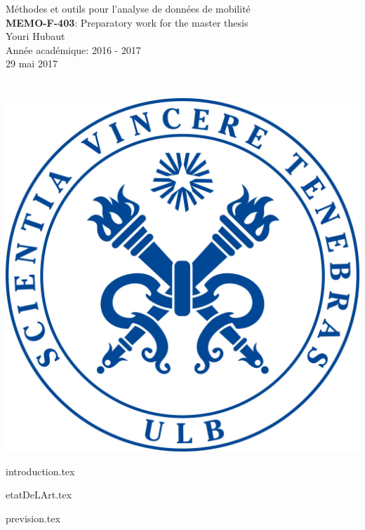 \documentclass[11pt,a4paper]{report}
\begin{document}

\begin{titlepage}
    \vspace*{\fill}
    \begin{center}
        \huge {Méthodes et outils pour l'analyse de données de mobilité} \\
	    \textbf{MEMO-F-403}: Preparatory work for the master thesis \\
	
	    \Large {Youri Hubaut}\\
        Année académique: 2016 - 2017\\
	    29 mai 2017 \\
	      \\
	      \\
	    \includegraphics[scale=0.1]{logo_ulb.jpg}
    \end{center}
    \vspace*{\fill}

\end{titlepage}

\newpage

\tableofcontents

\newpage

{introduction.tex}

{etatDeLArt.tex}

{prevision.tex}


{\footnotesize

}
\end{document}
